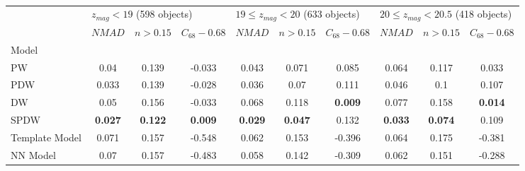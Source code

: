 \documentclass[fleqn,usenatbib]{mnras}
\begin{document}
\begin{table}
	\begin{tabular}{lccccccccc}
            \hline
            {} & \multicolumn{3}{l}{$z_{mag} < 19$ (598 objects)} & \multicolumn{3}{l}{$19 \leq z_{mag} < 20$ (633 objects)} & \multicolumn{3}{l}{$20 \leq z_{mag} < 20.5$ (418 objects)} \\
            {} &                       $NMAD$ &        $n>0.15$ & $C_{68} - 0.68$ &                               $NMAD$ &        $n>0.15$ & $C_{68} - 0.68$ &                                 $NMAD$ &        $n>0.15$ & $C_{68} - 0.68$ \\
            Model          &                              &                 &                 &                                      &                 &                 &                                        &                 &                 \\
            \hline
            PW             &                         0.04 &           0.139 &          -0.033 &                                0.043 &           0.071 &           0.085 &                                  0.064 &           0.117 &           0.033 \\
            PDW            &                        0.033 &           0.139 &          -0.028 &                                0.036 &            0.07 &           0.111 &                                  0.046 &             0.1 &           0.107 \\
            DW             &                         0.05 &           0.156 &          -0.033 &                                0.068 &           0.118 &  \textbf{0.009} &                                  0.077 &           0.158 &  \textbf{0.014} \\
            SPDW           &               \textbf{0.027} &  \textbf{0.122} &  \textbf{0.009} &                       \textbf{0.029} &  \textbf{0.047} &           0.132 &                         \textbf{0.033} &  \textbf{0.074} &           0.109 \\
            Template Model &                        0.071 &           0.157 &          -0.548 &                                0.062 &           0.153 &          -0.396 &                                  0.064 &           0.175 &          -0.381 \\
            NN Model       &                         0.07 &           0.157 &          -0.483 &                                0.058 &           0.142 &          -0.309 &                                  0.062 &           0.151 &          -0.288 \\
            \hline
            \end{tabular}
            \caption{}
\end{table}
\end{document}
